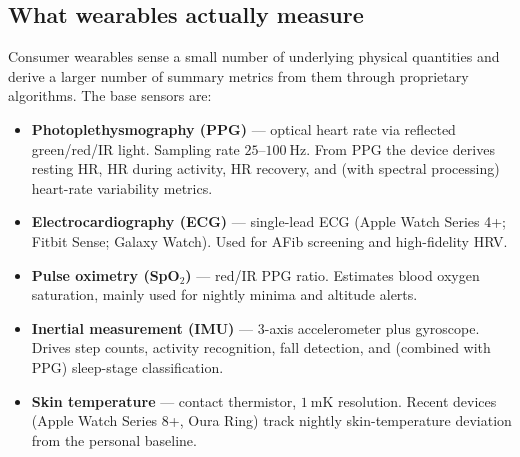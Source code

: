 \subsection{What wearables actually measure}\label{ss:measure}

Consumer wearables sense a small number of underlying physical
quantities and derive a larger number of summary metrics from them
through proprietary algorithms. The base sensors are:

\begin{itemize}[leftmargin=*,nosep,topsep=4pt]
   \item \textbf{Photoplethysmography (PPG)} ---
         optical heart rate via reflected green/red/IR light. Sampling
         rate $25$--$\SI{100}{\hertz}$. From PPG the device derives
         resting HR, HR during activity, HR recovery, and (with
         spectral processing) heart-rate variability metrics.
   \item \textbf{Electrocardiography (ECG)} ---
         single-lead ECG (Apple Watch Series 4+; Fitbit Sense; Galaxy
         Watch). Used for AFib screening and high-fidelity HRV.
   \item \textbf{Pulse oximetry (SpO$_2$)} ---
         red/IR PPG ratio. Estimates blood oxygen saturation, mainly
         used for nightly minima and altitude alerts.
   \item \textbf{Inertial measurement (IMU)} ---
         3-axis accelerometer plus gyroscope. Drives step counts,
         activity recognition, fall detection, and (combined with PPG)
         sleep-stage classification.
   \item \textbf{Skin temperature} ---
         contact thermistor, $\SI{1}{\milli\kelvin}$ resolution.
         Recent devices (Apple Watch Series 8+, Oura Ring) track
         nightly skin-temperature deviation from the personal
         baseline.
\end{itemize}

